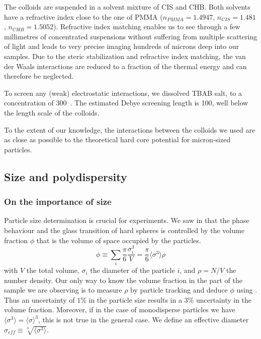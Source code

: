 The colloids are suspended in a solvent mixture of \ac{CIS} and \ac{CHB}. Both solvents have a refractive index close to the one of \ac{PMMA} ($n_{PMMA}=1.4947$, $n_{CIS}=1.481$, $n_{CHB}=1.5052$). Refractive index matching enables us to see through a few millimetres of concentrated suspensions without suffering from multiple scattering of light and leads to very precise imaging hundreds of microns deep into our samples. Due to the steric stabilization and refractive index matching, the van der Waals interactions are reduced to a fraction of the thermal energy and can therefore be neglected. 

To screen any (weak) electrostatic interactions, we dissolved \ac{TBAB} salt, to a concentration of \unit{300}{\nano\mole\per\liter}~\citep{royall2005}. The estimated Debye screening length is \unit{100}{\nano\metre}, well below the length scale of the colloids. 

To the extent of our knowledge, the interactions between the colloids we used are as close as possible to the theoretical hard core potential for micron-sized particles.


\subsection{Size and polydispersity}
\label{sec:size_poly}
\subsubsection{On the importance of size}

Particle size determination is crucial for experiments. We saw in  that the phase behaviour and the glass transition of hard spheres is controlled by the volume fraction $\phi$ that is the volume of space occupied by the particles.
\begin{equation}
	\phi \equiv \sum_i \frac{\pi}{6}\frac{\sigma_i^3}{V} = \frac{\pi}{6}\langle \sigma^3 \rangle \rho
	\label{eq:volume-fraction}
\end{equation}
with $V$ the total volume, $\sigma_i$ the diameter of the particle $i$, and $\rho=N/V$ the number density. Our only way to know the volume fraction in the part of the sample we are observing is to measure $\rho$ by particle tracking and deduce $\phi$ using . Thus an uncertainty of $1\%$ in the particle size results in a $3\%$ uncertainty in the volume fraction. Moreover, if in the case of monodisperse particles we have $\langle \sigma^3 \rangle = \langle \sigma \rangle^3$, this is not true in the general case. We define an effective diameter $\sigma_{eff} \equiv \sqrt[3]{\langle \sigma^3 \rangle}$.


